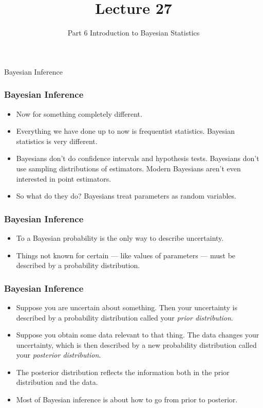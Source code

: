\documentclass[12pt]{beamer}
\title[ECON2843]{Lecture 27}
\subtitle{Part 6 Introduction to Bayesian Statistics}
\date{}
\begin{document}
	\begin{frame}
		\titlepage
		
	\end{frame}
		\begin{frame}
		\vspace{1cm}
		\centering
		{\color{blue}\large Bayesian Inference}
	\end{frame}
\begin{frame}
	\frametitle{Bayesian Inference}
	
	\begin{itemize}[label={\color{blue}$\blacktriangleright$}]
		\item Now for something completely different.
		
		\item Everything we have done up to now is frequentist statistics.
		Bayesian statistics is very different.
		
		\item Bayesians don't do confidence intervals and hypothesis tests.
		Bayesians don't use sampling distributions of estimators. Modern
		Bayesians aren't even interested in point estimators.
		
		\item So what do they do? Bayesians treat parameters as random
		variables.
			\end{itemize}
	\end{frame}
\begin{frame}
	\frametitle{Bayesian Inference}
	\begin{itemize}[label={\color{blue}$\blacktriangleright$}]
		\item To a Bayesian probability is the only way to describe uncertainty.
		\item Things not known for certain --- like values of parameters ---
		must be described by a probability distribution.
	\end{itemize}
	
\end{frame}
\begin{frame}
	\frametitle{Bayesian Inference}
	
	\begin{itemize}[label={\color{blue}$\blacktriangleright$}]
		\item Suppose you are uncertain about something. Then your uncertainty is described by a probability distribution called your \textit{prior distribution}.
		
		\item Suppose you obtain some data relevant to that thing. The data changes your uncertainty, which is then described by a new probability distribution called your \textit{posterior distribution}.
		
		\item The posterior distribution reflects the information both in the prior distribution and the data.
		
		\item Most of Bayesian inference is about how to go from prior to posterior.
	\end{itemize}
	
\end{frame}
\end{document}
